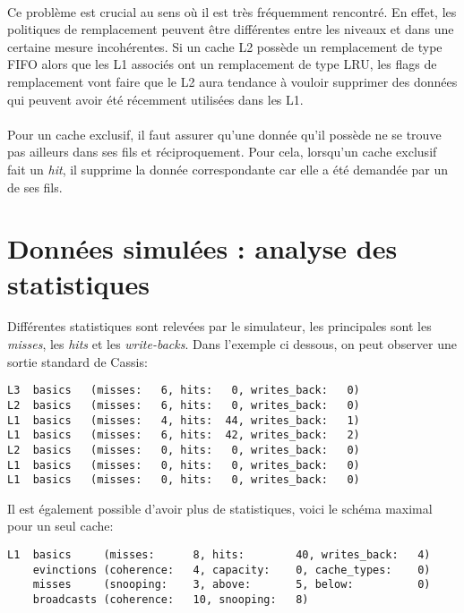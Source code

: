 \paragraph{}
Ce problème est crucial au sens où il est très fréquemment rencontré. En effet, les politiques de remplacement peuvent être différentes entre les niveaux et dans une certaine mesure incohérentes. Si un cache L2 possède un remplacement de type FIFO alors que les L1 associés ont un remplacement de type LRU, les flags de remplacement vont faire que le L2 aura tendance à vouloir supprimer des données qui peuvent avoir été récemment utilisées dans les L1.

\paragraph{}
Pour un cache exclusif, il faut assurer qu'une donnée qu'il possède ne se trouve pas ailleurs dans ses fils et réciproquement. Pour cela, lorsqu'un cache exclusif fait un \emph{hit}, il supprime la donnée correspondante car elle a été demandée par un de ses fils.

\section{Données simulées : analyse des statistiques}

Différentes statistiques sont relevées par le simulateur, les principales sont les \emph{misses}, les \emph{hits} et les \emph{write-backs}. Dans l'exemple ci dessous, on peut observer une sortie standard de \textsf{Cassis}:
\begin{lstlisting}
L3  basics   (misses:   6, hits:   0, writes_back:   0)
L2  basics   (misses:   6, hits:   0, writes_back:   0)
L1  basics   (misses:   4, hits:  44, writes_back:   1)
L1  basics   (misses:   6, hits:  42, writes_back:   2)
L2  basics   (misses:   0, hits:   0, writes_back:   0)
L1  basics   (misses:   0, hits:   0, writes_back:   0)
L1  basics   (misses:   0, hits:   0, writes_back:   0)
\end{lstlisting}


Il est également possible d'avoir plus de statistiques, voici le schéma maximal pour un seul cache:
\begin{lstlisting}
L1  basics     (misses:      8, hits:        40, writes_back:   4)
    evinctions (coherence:   4, capacity:    0, cache_types:    0)
    misses     (snooping:    3, above:       5, below:          0)
    broadcasts (coherence:   10, snooping:   8)
\end{lstlisting}


